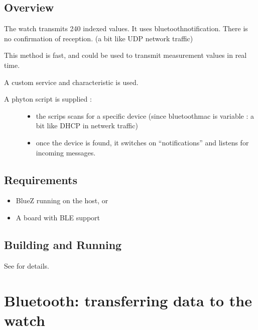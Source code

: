 \documentclass[letterpaper,10pt,english]{sphinxmanual}
\begin{document}
\subsection{Overview}
\label{\detokenize{samples/samplesbluetoothperipheral-notificationREADME:overview}}
The watch transmits 240 indexed values.
It uses bluetoothnotification.
There is no confirmation of reception. (a bit like UDP network traffic)

This method is fast, and could be used to transmit measurement values in real time.

A custom service and characteristic is used.
\begin{description}
\item[{A phyton script is supplied :}] \leavevmode\begin{itemize}
\item {} 
the scrips scans for a specific device (since bluetoothmac is variable : a bit like DHCP in netwerk traffic)

\item {} 
once the device is found, it switches on “notifications” and listens for incoming messages.

\end{itemize}

\end{description}


\subsection{Requirements}
\label{\detokenize{samples/samplesbluetoothperipheral-notificationREADME:requirements}}\begin{itemize}
\item {} 
BlueZ running on the host, or

\item {} 
A board with BLE support

\end{itemize}


\subsection{Building and Running}
\label{\detokenize{samples/samplesbluetoothperipheral-notificationREADME:building-and-running}}
See  for details.


\section{Bluetooth: transferring data to the watch}
\label{\detokenize{samples/samplesbluetoothperipheralREADME:bluetooth-transferring-data-to-the-watch}}\label{\detokenize{samples/samplesbluetoothperipheralREADME:ble-peripheral}}\label{\detokenize{samples/samplesbluetoothperipheralREADME::doc}}
\end{document}
